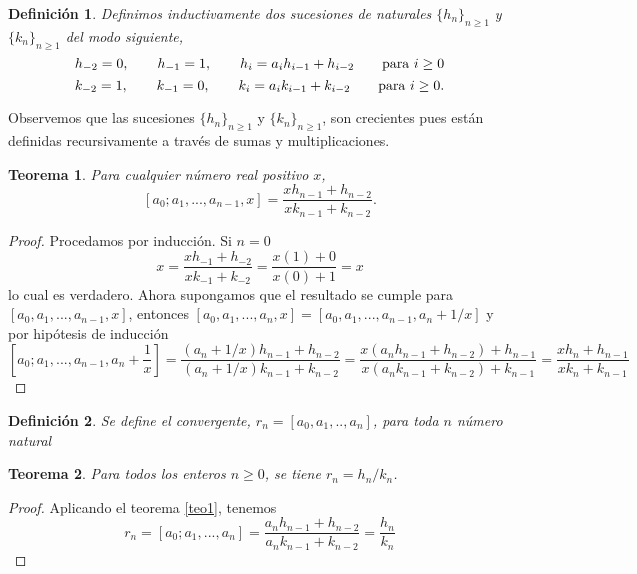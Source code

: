 \documentclass[11pt, article]{article}
\newtheorem{theorem}{Teorema} %
\newtheorem{definition}{Definición}
\begin{document}
    \begin{definition}
     Definimos inductivamente dos sucesiones de naturales $\{h_n\}_{n\geq 1}$ y $\{k_n\}_{n\geq 1}$ del modo siguiente,
        \[
        h_{-2}=0, \qquad h_{-1} =1, \qquad h_i=a_ih_{i-1} + h_{i-2} \qquad \textnormal{para } i\geq 0
        \]
        \[
        k_{-2}=1, \qquad k_{-1} =0, \qquad k_i=a_ik_{i-1} + k_{i-2} \qquad \textnormal{para } i\geq 0.
        \]
        \end{definition}
        Observemos que las sucesiones $\{h_n\}_{n\geq 1}$ y $\{k_n\}_{n\geq 1}$, son crecientes pues están definidas recursivamente a través de sumas y multiplicaciones.
        \begin{theorem}
        Para cualquier número real positivo $x$,
        \[
        [a_0;a_1,...,a_{n-1}, x]=\dfrac{xh_{n-1}+h_{n-2}}{xk_{n-1}+k_{n-2}}. \label{teo1}
        \]
        \end{theorem}
    \begin{proof} Procedamos por inducción. Si $n=0$
        \[
        x=\dfrac{xh_{-1}+h_{-2}}{xk_{-1}+k_{-2}}=\dfrac{x(1)+0}{x(0)+1}=x
        \]
        lo cual es verdadero. Ahora supongamos que el resultado se cumple para $[a_0,a_1,...,a_{n-1},x]$, entonces $[a_0,a_1,...,a_n,x]=[a_0,a_1,...,a_{n-1},a_n + 1/x]$ y por hipótesis de inducción
    \[
        \left[a_0;a_1,...,a_{n-1},a_n + \dfrac{1}{x}\right] 
        =  \dfrac{(a_n+1/x)h_{n-1}+h_{n-2}}{(a_n+1/x)k_{n-1}+k_{n-2}} 
        = \dfrac{x(a_nh_{n-1}+h_{n-2})+h_{n-1}}{x(a_nk_{n-1}+k_{n-2})+k_{n-1}} 
        = \dfrac{xh_n+h_{n-1}}{xk_n+k_{n-1}}
    \]
    \end{proof}
    
    
    \begin{definition} Se define el convergente, $r_n=[a_0,a_1,..,a_n]$, para toda $n$ número natural
    \end{definition}
    
    \begin{theorem}
        Para todos los enteros $n \geq 0$, se tiene $r_n=h_n/k_n$.
    \end{theorem} 

    
    \begin{proof}
        Aplicando el teorema \ref{teo1}, tenemos
    \[
    r_n=[a_0;a_1,...,a_n]=\dfrac{a_nh_{n-1}+h_{n-2}}{a_nk_{n-1}+k_{n-2}}=\dfrac{h_n}{k_n}\]
    \end{proof} 
    
\end{document}
